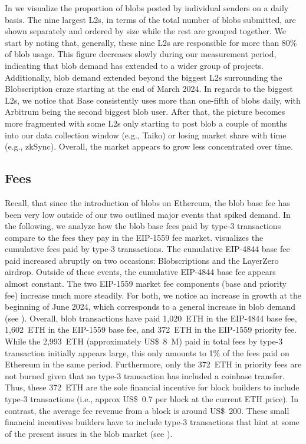 In  we visualize the proportion of blobs posted by individual senders on a daily basis. The nine largest L2s, in terms of the total number of blobs submitted, are shown separately and ordered by size while the rest are grouped together. We start by noting that, generally, these nine L2s are responsible for more than 80\% of blob usage. This figure decreases slowly during our measurement period, indicating that blob demand has extended to a wider group of projects. Additionally, blob demand extended beyond the biggest L2s surrounding the Blobscription craze starting at the end of March 2024. In regards to the biggest L2s, we notice that Base consistently uses more than one-fifth of blobs daily, with Arbitrum being the second biggest blob user. After that, the picture becomes more fragmented with some L2s only starting to post blob a couple of months into our data collection window (e.g., Taiko) or losing market share with time (e.g., zkSync). Overall, the market appears to grow less concentrated over time. 



\subsection{Fees}
Recall, that since the introduction of blobs on Ethereum, the blob base fee has been very low outside of our two outlined major events that spiked demand. In the following, we analyze how the blob base fees paid by type-3 transactions compare to the fees they pay in the EIP-1559 fee market.  visualizes the cumulative fees paid by type-3 transactions. The cumulative EIP-4844 base fee paid increased abruptly on two occasions: Blobscriptions and the LayerZero airdrop. Outside of these events, the cumulative EIP-4844 base fee appears almost constant. The two EIP-1559 market fee components (base and priority fee) increase much more steadily. For both, we notice an increase in growth at the beginning of June 2024, which corresponds to a general increase in blob demand (see ). Overall, blob transactions have paid 1,020~ETH in the EIP-4844 base fee, 1,602~ETH in the EIP-1559 base fee, and 372~ETH in the EIP-1559 priority fee. While the 2,993~ETH (approximately US\$~8~M) paid in total fees by type-3 transaction initially appears large, this only amounts to 1\% of the fees paid on Ethereum in the same period. Furthermore, only the 372~ETH in priority fees are not burned given that no type-3 transaction has included a coinbase transfer. Thus, these 372~ETH are the sole financial incentive for block builders to include type-3 transactions (i.e., approx US\$~0.7 per block at the current ETH price). In contrast, the average fee revenue from a block is around US\$~200. These small financial incentives builders have to include type-3 transactions that hint at some of the present issues in the blob market (see ). 



